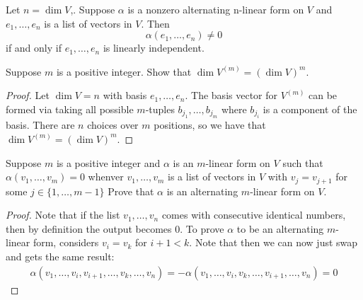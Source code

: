\documentclass{extarticle}
\begin{document}
\begin{corollary}
    Let \(n = \dim V\),. Suppose \(\alpha\) is a nonzero alternating n-linear form on \(V\) and 
    \(e_1, \ldots, e_n\) is a list of vectors in \(V\). Then 
    \[\alpha (e_1, \ldots, e_n) \neq 0\]
    if and only if \(e_1, \ldots, e_n\) is linearly independent. 
\end{corollary}


\newpage 
{}

\begin{problem}{1}
    Suppose \(m\) is a positive integer. Show that \(\dim V^{(m)} = \left( \dim V \right)^m\).
\end{problem}

\begin{proof}
Let \(\dim V = n\) with basis \(e_1, \ldots, e_n\). The basis vector for \(V^{(m)}\) can be formed 
via taking all possible \(m\)-tuples \(b_{j_1}, \ldots, b_{j_m}\) where \(b_{j_i}\) is a component of the basis. 
There are \(n\) choices over \(m\) positions, so we have that \(\dim V^{(m)} = \left( \dim V \right)^m\).
\end{proof}

\begin{problem}{3}
    Suppose \(m\) is a positive integer and \(\alpha\) is an \(m\)-linear form on \(V\) such that 
    \(\alpha(v_1, \ldots, v_m) = 0\) whenver \(v_1, \ldots, v_m\) is a list of vectors in \(V\) with 
    \(v_j = v_{j+1}\) for some \(j \in \{1, \ldots, m-1\}\) Prove that \(\alpha\) is an alternating 
    \(m\)-linear form on \(V\).
\end{problem}

\begin{proof}
Note that if the list \(v_1, \ldots, v_n\) comes with consecutive identical numbers, then by definition the 
output becomes 0. To prove \(\alpha\) to be an alternating \(m\)-linear form, considers \(v_i = v_k\) for 
\(i+1 < k\). Note that then we can now just swap and gets the same result: 
\begin{align*}
    \alpha(v_1, \ldots, v_i, v_{i+1}, \ldots, v_k, \ldots, v_n)  
    = - \alpha(v_1, \ldots, v_i, v_{k}, \ldots, v_{i+1}, \ldots, v_n) = 0  
\end{align*}
\end{proof}
\end{document}
